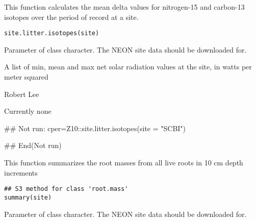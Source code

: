 \documentclass[a4paper]{book}
\begin{document}
%
\begin{Description}\relax
This function calculates the mean delta values for
nitrogen-15 and carbon-13 isotopes over the period of record at a site.
\end{Description}
%
\begin{Usage}
\begin{verbatim}
site.litter.isotopes(site)
\end{verbatim}
\end{Usage}
%
\begin{Arguments}
\begin{ldescription}
\item[\code{site}] Parameter of class character.
The NEON site data should be downloaded for.
\end{ldescription}
\end{Arguments}
%
\begin{Value}
A list of min, mean and max net solar radiation
values at the site, in watts per meter squared
\end{Value}
%
\begin{Author}\relax
Robert Lee \\{}
\end{Author}
%
\begin{SeeAlso}\relax
Currently none
\end{SeeAlso}
%
\begin{Examples}
\begin{ExampleCode}
## Not run: 
cper=Z10::site.litter.isotopes(site = "SCBI")

## End(Not run)
\end{ExampleCode}
\end{Examples}
%
\begin{Description}\relax
This function summarizes the root masses from all live
roots in 10 cm depth increments
\end{Description}
%
\begin{Usage}
\begin{verbatim}
## S3 method for class 'root.mass'
summary(site)
\end{verbatim}
\end{Usage}
%
\begin{Arguments}
\begin{ldescription}
\item[\code{site}] Parameter of class character.
The NEON site data should be downloaded for.
\end{ldescription}
\end{Arguments}
\end{document}
